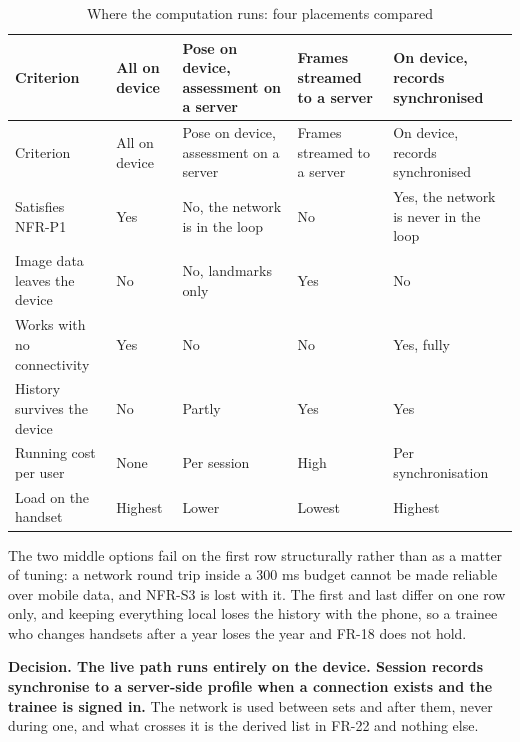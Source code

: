 {\footnotesize
\setlength{\LTpre}{6pt}\setlength{\LTpost}{8pt}
\begin{longtable}{>{\raggedright\arraybackslash}p{}>{\raggedright\arraybackslash}p{}>{\raggedright\arraybackslash}p{}>{\raggedright\arraybackslash}p{}>{\raggedright\arraybackslash}p{}}
\caption{Where the computation runs: four placements compared}\\
\toprule
Criterion & All on device & Pose on device, assessment on a server & Frames streamed to a server & On device, records synchronised \\
\midrule
\endfirsthead
\toprule
Criterion & All on device & Pose on device, assessment on a server & Frames streamed to a server & On device, records synchronised \\
\midrule
\endhead
\bottomrule
\endfoot
\bottomrule
\endlastfoot
Satisfies NFR-P1 & Yes & No, the network is in the loop & No & Yes, the network is never in the loop \\
Image data leaves the device & No & No, landmarks only & Yes & No \\
Works with no connectivity & Yes & No & No & Yes, fully \\
History survives the device & No & Partly & Yes & Yes \\
Running cost per user & None & Per session & High & Per synchronisation \\
Load on the handset & Highest & Lower & Lowest & Highest \\
\end{longtable}
}

The two middle options fail on the first row structurally rather than as a matter of tuning: a network round trip inside a 300 ms budget cannot be made reliable over mobile data, and NFR-S3 is lost with it. The first and last differ on one row only, and keeping everything local loses the history with the phone, so a trainee who changes handsets after a year loses the year and FR-18 does not hold.

\textbf{Decision. The live path runs entirely on the device. Session records synchronise to a server-side profile when a connection exists and the trainee is signed in.} The network is used between sets and after them, never during one, and what crosses it is the derived list in FR-22 and nothing else.

